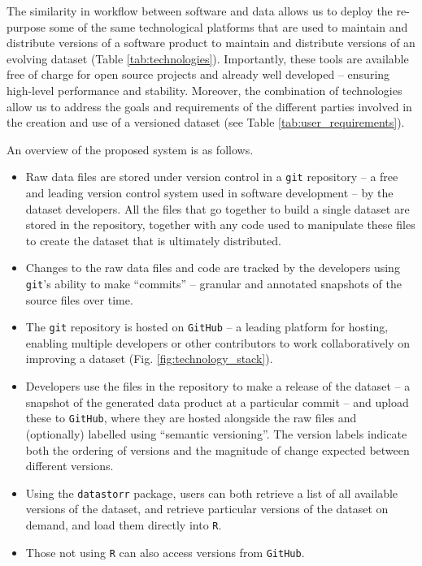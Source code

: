 \documentclass[a4paper,num-refs]{assets/oup-contemporary}
\begin{document}
The similarity in workflow between software and data allows us to deploy the re-purpose some of the same technological platforms that are used to maintain and distribute versions of a software product to maintain and distribute versions of an evolving dataset (Table \ref{tab:technologies}). Importantly, these tools are available free of charge for open source projects and already well developed -- ensuring high-level performance and stability. Moreover, the combination of technologies allow us to address the goals and requirements of the different parties involved in the creation and use of a versioned dataset (see Table \ref{tab:user_requirements}). 

An overview of the proposed system is as follows.
\begin{itemize}
  \item Raw data files are stored under version control in a \texttt{git} repository --  a free and leading version control system used in software development -- by the dataset developers. All the files that go together to build a single dataset are stored in the repository, together with any code used to manipulate these files to create the dataset that is ultimately distributed.
  \item Changes to the raw data files and code are tracked by the developers using  \texttt{git}'s ability to make ``commits'' -- granular and annotated snapshots of the source files over time.
  \item The \texttt{git} repository is hosted on \texttt{GitHub} -- a leading platform for hosting, enabling multiple developers or other contributors to work collaboratively on improving a dataset (Fig. \ref{fig:technology_stack}).
  \item Developers use the files in the repository to make a release of the dataset -- a snapshot of the generated data product at a particular commit -- and upload these to \texttt{GitHub}, where they are hosted alongside the raw files and (optionally) labelled using ``semantic versioning''. The version labels indicate both the ordering of versions and the magnitude of change expected between different versions.
  \item Using the \texttt{datastorr} package, users can both retrieve a list of all available versions of the dataset, and retrieve particular versions of the dataset on demand, and load them directly into \texttt{R}. 
  \item Those not using \texttt{R} can also access versions from \texttt{GitHub}.
\end{itemize}
\end{document}
